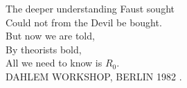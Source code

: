 \documentclass[11pt,a4paper]{report}      %
\begin{document}
\thesiscopyrightpage                 %

\thesistitlecolourpage           %


\newpage

\vspace*{\fill}

\raggedright\Large{
\hspace{3cm} The deeper understanding Faust sought\\
\hspace{3cm} Could not from the Devil be bought.\\
\hspace{3cm} But now we are told,\\
\hspace{3cm} By theorists bold,\\
\hspace{3cm} All we need to know is $R_0$.\\}
\vspace{0.8cm}
\raggedleft\normalsize\MakeUppercase{Dahlem Workshop, Berlin 1982} \cite{Anderson1982_workshop}.

\vspace*{\fill}
\raggedright

\tableofcontents    %


%                   
\end{document}
